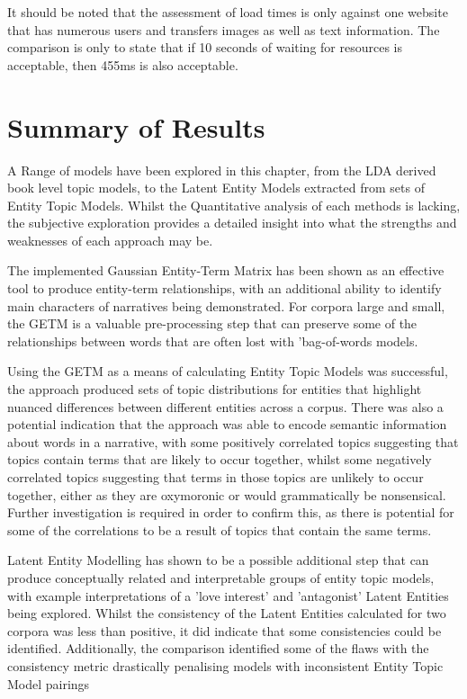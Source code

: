 \documentclass[10pt]{report}
\begin{document}
It should be noted that the assessment of load times is only against one website that has numerous users and transfers images as well as text information. The comparison is only to state that if 10 seconds of waiting for resources is acceptable, then 455ms is also acceptable.

\section{Summary of Results}
A Range of models have been explored in this chapter, from the LDA derived book level topic models, to the Latent Entity Models extracted from sets of Entity Topic Models. Whilst the Quantitative analysis of each methods is lacking, the subjective exploration provides a detailed insight into what the strengths and weaknesses of each approach may be.

The implemented Gaussian Entity-Term Matrix has been shown as an effective tool to produce entity-term relationships, with an additional ability to identify main characters of narratives being demonstrated. For corpora large and small, the GETM is a valuable pre-processing step that can preserve some of the relationships between words that are often lost with 'bag-of-words models.

Using the GETM as a means of calculating Entity Topic Models was successful, the approach produced sets of topic distributions for entities that highlight nuanced differences between different entities across a corpus. There was also a potential indication that the approach was able to encode semantic information about words in a narrative, with some positively correlated topics suggesting that topics contain terms that are likely to occur together, whilst some negatively correlated topics suggesting that terms in those topics are unlikely to occur together, either as they are oxymoronic or would grammatically be nonsensical. Further investigation is required in order to confirm this, as there is potential for some of the correlations to be a result of topics that contain the same terms.

Latent Entity Modelling has shown to be a possible additional step that can produce conceptually related and interpretable groups of entity topic models, with example interpretations of a 'love interest' and 'antagonist' Latent Entities being explored. Whilst the consistency of the Latent Entities calculated for two corpora was less than positive, it did indicate that some consistencies could be identified. Additionally, the comparison identified some of the flaws with the consistency metric drastically penalising models with inconsistent Entity Topic Model pairings
\end{document}
